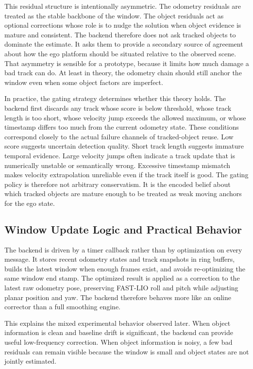 \documentclass[a4paper,12pt]{article}
\begin{document}
This residual structure is intentionally asymmetric. The odometry residuals are treated as the stable backbone of the window. The object residuals act as optional corrections whose role is to nudge the solution when object evidence is mature and consistent. The backend therefore does not ask tracked objects to dominate the estimate. It asks them to provide a secondary source of agreement about how the ego platform should be situated relative to the observed scene. That asymmetry is sensible for a prototype, because it limits how much damage a bad track can do. At least in theory, the odometry chain should still anchor the window even when some object factors are imperfect.

In practice, the gating strategy determines whether this theory holds. The backend first discards any track whose score is below threshold, whose track length is too short, whose velocity jump exceeds the allowed maximum, or whose timestamp differs too much from the current odometry state. These conditions correspond closely to the actual failure channels of tracked-object reuse. Low score suggests uncertain detection quality. Short track length suggests immature temporal evidence. Large velocity jumps often indicate a track update that is numerically unstable or semantically wrong. Excessive timestamp mismatch makes velocity extrapolation unreliable even if the track itself is good. The gating policy is therefore not arbitrary conservatism. It is the encoded belief about which tracked objects are mature enough to be treated as weak moving anchors for the ego state.

\subsection{Window Update Logic and Practical Behavior}
The backend is driven by a timer callback rather than by optimization on every message. It stores recent odometry states and track snapshots in ring buffers, builds the latest window when enough frames exist, and avoids re-optimizing the same window end stamp. The optimized result is applied as a correction to the latest raw odometry pose, preserving FAST-LIO roll and pitch while adjusting planar position and yaw. The backend therefore behaves more like an online corrector than a full smoothing engine.

This explains the mixed experimental behavior observed later. When object information is clean and baseline drift is significant, the backend can provide useful low-frequency correction. When object information is noisy, a few bad residuals can remain visible because the window is small and object states are not jointly estimated.
\end{document}
